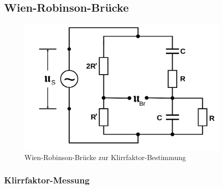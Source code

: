 \subsection{Wien-Robinson-Brücke}
\begin{figure}
  \centering
  \includegraphics[width=0.9\textwidth]{Bilder/wien_robinson_bruecke.png}
  \caption{Wien-Robinson-Brücke zur Klirrfaktor-Bestimmung \cite{Anleitung}}
  \label{fig:wienrobinsonbrücke}
\end{figure}
\blindtext
\subsubsection{Klirrfaktor-Messung}
\blindtext
